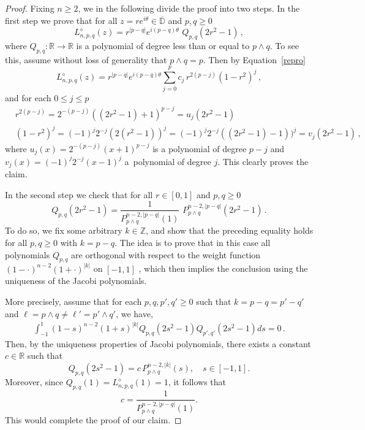 \documentclass[10pt,a4paper]{amsart}
\begin{document}
\begin{proof}
Fixing  $n \geq 2$, we   in the following  divide the proof  into two steps.  In the first step we prove that for all  $z = re^{i\theta} \in \overline{\mathbb{D}} $  and  $p,q \ge 0$
  \[
  L^{\diamond}_{n,p,q}(z) = r^{|p-q|}  e^{i(p-q)\theta}
  \,\,
  Q_{p,q}(2r^2 -1) \,,
  \]
 where   $Q_{p,q}: \mathbb{R} \to \mathbb{R} $  is a polynomial  of degree
  less than or equal to $ p \wedge q  $.
  To see this, assume  without loss of generality  that  $p \wedge q = p $.
Then by Equation~\eqref{repro}
  \begin{equation*}
  L_{n,p,q}^{\diamond} (z) =  r^{|p-q|}  e^{i (p-q)\theta}
    \sum_{j=0}^{p}c_j \,r^{2(p-j)}
    (1-r^2)^j  \,,
 \end{equation*}
 and for each  $0 \leq j \leq p $
 \begin{align*}
   &
   r^{2(p-j)} = 2^{-(p-j)}((2r^2 -1)+1)^{p-j} = u_j(2r^2 -1)
   \\&
   (1-r^2)^j
    = (-1)^j 2^{-j}(2(r^2-1))^j = (-1)^j 2^{-j}((2r^2-1)-1))^j =v_j(2r^2 -1)\,,
     \end{align*}
 where  $u_j(x) = 2^{-(p-j)}(x+1)^{p-j} $ is a polynomial of degree  $ p-j $
 and  $v_j(x) = (-1)^j 2^{-j}(x-1)^{j} $ a~polynomial of degree  $ j $.  This clearly proves the claim.




  In the second step we  check that   for all  $r \in [0,1] $ and $p,q \ge 0 $
  \[
  Q_{p,q}(2r^2 -1) = \frac{1}{P_{p\wedge q}^{n-2,|p-q|}(1)}\,\, P_{p\wedge q}^{n-2,|p-q|}(2r^2 -1)\,.
  \]
  To do so, we fix some  arbitrary $k \in \mathbb{Z} $,  and
  show that the preceding  equality holds
  for all  $p,q \ge 0 $ with $k = p-q$.  The idea is to
  prove that in this case all  polynomials $Q_{p,q}$ are
  orthogonal with respect to the weight function
 $ (1-\pmb{\cdot})^{n-2}(1+ \pmb{\cdot})^{|k|}$  on  $[-1,1]$ , which then implies the conclusion using the uniqueness of the Jacobi polynomials.

 More precisely,  assume that for each  $p,q,p',q' \ge 0$
 such that $k = p-q=p'-q'$ and
 $\ell = p\wedge q \neq \ell' = p'\wedge q' $,
 we have,
  \begin{align} \label{koorwin}
    \int_{-1}^{1}  (1-s)^{n-2}(1+s)^{|k|} Q_{p,q}(2s^2 -1)  Q_{p',q'}(2s^2 -1) ds = 0\,.
  \end{align}
Then, by the uniqueness properties of Jacobi polynomials, there exists a constant $c \in \mathbb{R}$ such that
\[
Q_{p,q}(2s^2 -1) = c \, P_{p \wedge q}^{n-2, |k|}(s), \quad s \in [-1,1].
\]
Moreover, since $Q_{p,q}(1) = L_{n,p,q}^{\diamond}(1) = 1$, it follows that
\[
c = \frac{1}{P_{p \wedge q}^{n-2, |p-q|}(1)}.
\]
  This would complete the proof of our claim.


\end{proof}
\end{document}
